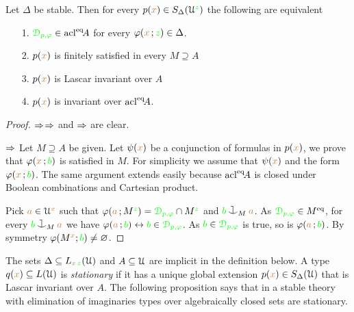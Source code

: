 \begin{proposition}\label{prop_type_over_acl2}
  Let $\Delta$ be stable.
  Then for every $p({\color{brown} x})\in S_\Delta(\EuScript U^{\color{green} z})$ the following are equivalent
  \begin{itemize}
  \item[1.] ${\color{green}\EuScript D_{p,\varphi}}\in {\rm acl}^{{\rm eq}}\!A$ for every $\varphi({\color{brown} x}\,;{\color{green} z})\in\Delta$.
  \item[2.] $p({\color{brown} x})$ is finitely satisfied in every $M\supseteq A$
  \item[3.] $p({\color{brown} x})$ is Lascar invariant over $A$
  \item[4.] $p({\color{brown} x})$ is invariant over ${\rm acl}^{{\rm eq}}\!A$.
  \end{itemize}
\end{proposition}
\begin{proof}
  $\Rightarrow$$\Rightarrow$ and $\Rightarrow$ are clear.

  $\Rightarrow$
  Let $M\supseteq A$ be given.
  Let $\psi({\color{brown} x})$ be a conjunction of formulas in $p({\color{brown} x})$, we prove that $\varphi({\color{brown} x}\,;{\color{green} b})$ is satisfied in $M$.
  For simplicity we assume that $\psi({\color{brown} x})$ and the form $\varphi({\color{brown} x}\,;{\color{green} b})$.
  The same argument extends easily because ${\rm acl}^{{\rm eq}}\!A$ is closed under Boolean combinations and Cartesian product.

  Pick ${\color{brown} a}\in\EuScript U^{\color{brown} x}$ such that $\varphi({\color{brown} a}\,;M^{\color{green} z})={\color{green}\EuScript D_{p,\varphi}}\cap M^{\color{green} z}$ and ${\gr b}\cnonfork_M{\mr a}$.
  As ${\color{green}\EuScript D_{p,\varphi}}\in M^{{\rm eq}}$, for every ${\gr b}\cnonfork_M{\mr a}$ we have $\varphi({\color{brown} a}\,;{\color{green} b})\leftrightarrow{\color{green}b}\in{\color{green}\EuScript D_{p,\varphi}}$.
  As ${\color{green} b}\in{\color{green}\EuScript D_{p,\varphi}}$ is true, so is $\varphi({\color{brown} a}\,;{\color{green} b})$.
  By symmetry $\varphi(M^{\color{brown} x};{\color{green} b})\neq\varnothing$.
\end{proof}

The sets $\Delta\subseteq L_{{\color{brown} x}\,{\color{green} z}}(\EuScript U)$ and $A\subseteq\EuScript U$ are implicit in the definition below.
A type $q({\color{brown} x})\subseteq L(\EuScript U)$ is \emph{stationary\/} if it has a unique global extension $p({\color{brown} x})\in S_\Delta(\EuScript U)$ that is Lascar invariant over $A$.
The following proposition says that in a stable theory with elimination of imaginaries types over algebraically closed sets are stationary.


